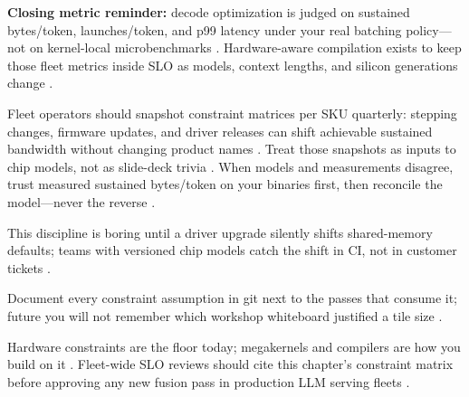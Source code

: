 \textbf{Closing metric reminder:} decode optimization is judged on sustained bytes/token, launches/token, and p99 latency under your real batching policy---not on kernel-local microbenchmarks \citep{taxbreak2026,memoryfloor2026,patel2025llminference}.
Hardware-aware compilation exists to keep those fleet metrics inside SLO as models, context lengths, and silicon generations change \citep{kwon2023vllm,liu2024deepseekv3,nvidia2024cudagraphs}.

Fleet operators should snapshot constraint matrices per SKU quarterly: stepping changes, firmware updates, and driver releases can shift achievable sustained bandwidth without changing product names \citep{nvidia2022hopper,amd2024xdna,memoryfloor2026}.
Treat those snapshots as inputs to chip models, not as slide-deck trivia \citep{patel2025llminference,dlbook}.
When models and measurements disagree, trust measured sustained bytes/token on your binaries first, then reconcile the model---never the reverse \citep{taxbreak2026,memoryfloor2026,semianalysis2024tma}.

This discipline is boring until a driver upgrade silently shifts shared-memory defaults; teams with versioned chip models catch the shift in CI, not in customer tickets \citep{nvidia2022hopper,memoryfloor2026}.

Document every constraint assumption in git next to the passes that consume it; future you will not remember which workshop whiteboard justified a tile size \citep{dlbook,patel2025llminference,taxbreak2026}.

Hardware constraints are the floor today; megakernels and compilers are how you build on it \citep{patel2025llminference,nvidia2022hopper}.
Fleet-wide SLO reviews should cite this chapter's constraint matrix before approving any new fusion pass in production LLM serving fleets \citep{patel2025llminference,memoryfloor2026}.

